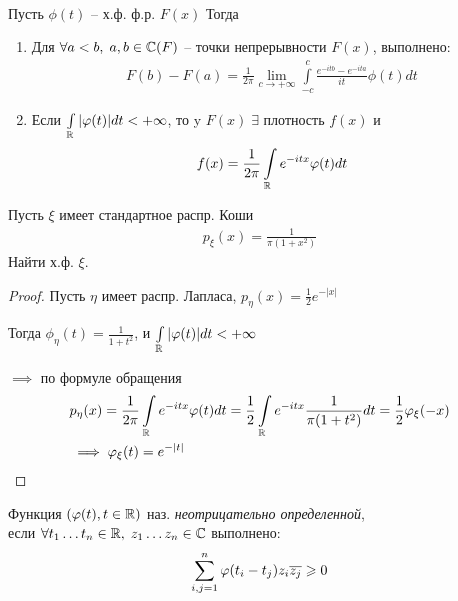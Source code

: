 \begin{theorem}~

  Пусть $\phi(t)$ -- х.ф. ф.р. $F(x)$
  Тогда
  \begin{enumerate}
    \item
      Для $\forall a < b, \; a, b \in \mathbb{C}(F)$ -- точки непрерывности $F(x)$, выполнено:
      \begin{align*}
        F(b) - F(a) = \frac{1}{2 \pi} \lim_{c \to +\infty} 
        \int\limits_{-c}^{c} \frac{e^{- i t b} - e^{- i t a}}{it} \phi(t) dt
      \end{align*}

    \item
      Если $\int\limits_{\mathbb{R}} |\varphi(t)| dt < +\infty$, 
      то y $F(x) \; \exists$ плотность $f(x)$ и
      \begin{align*}
        f(x) = \frac{1}{2\pi} \int\limits_{\mathbb{R}} e^{-i t x} \varphi(t) dt
      \end{align*}
  \end{enumerate}

\end{theorem}

\begin{example}
  Пусть $\xi$ имеет стандартное распр. Коши
  \begin{align*}
    p_{\xi} (x) = \frac{1}{\pi (1 + x^2)}
  \end{align*}
  Найти х.ф. $\xi$.

  \begin{proof}
    Пусть $\eta$ имеет распр. Лапласа, $p_{\eta} (x) = \frac{1}{2} e^{-|x|}$

    Тогда $\phi_{\eta} (t) = \frac{1}{1 + t^2}$, и
    $\int\limits_{\mathbb{R}} |\varphi(t)| dt < +\infty$

    $\implies$ по формуле обращения 
    \begin{align*}
      &p_{\eta}(x) = \frac{1}{2 \pi} \int\limits_{\mathbb{R}} e^{- i t x} \varphi(t) dt 
      = \frac{1}{2} \int\limits_{\mathbb{R}} e^{- i t x} \frac{1}{\pi (1 + t^2)} dt
      = \frac{1}{2} \varphi_\xi (-x)\\
      &\implies  \varphi_{\xi} (t) = e^{-|t|}
    \end{align*}
  \end{proof}
\end{example}


\begin{definition}
  Функция $(\varphi(t), t \in \mathbb{R})$ наз. \emph{неотрицательно определенной},\\
  если $\forall t_1 \ldots t_n \in \mathbb{R}, \; z_1 \ldots z_n \in \mathbb{C}$ выполнено:
  \begin{align*}
    \sum_{i, j = 1}^{n} \varphi(t_i - t_j) z_i \overline{z_j} \geqslant 0
  \end{align*}
\end{definition}

